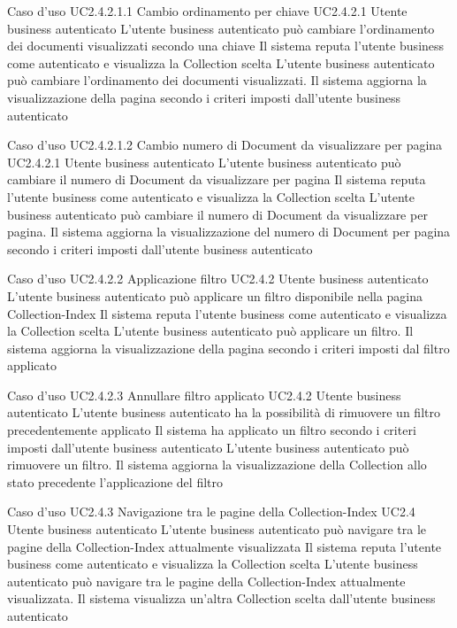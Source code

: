 \UCtitle
{Caso d'uso UC2.4.2.1.1}
{Cambio ordinamento per chiave}
\UC
{UC2.4.2.1}
{Utente business autenticato}
{L'utente business autenticato può cambiare l'ordinamento dei documenti visualizzati secondo una chiave}
{Il sistema reputa l'utente business come autenticato e visualizza la Collection scelta}
\scenario
{L'utente business autenticato può cambiare l'ordinamento dei documenti visualizzati.}
\post
{Il sistema aggiorna la visualizzazione della pagina secondo i criteri imposti dall'utente business autenticato}


\UCtitle
{Caso d'uso UC2.4.2.1.2}
{Cambio numero di Document da visualizzare per pagina}
\UC
{UC2.4.2.1}
{Utente business autenticato}
{L'utente business autenticato può cambiare il numero di Document da visualizzare per pagina}
{Il sistema reputa l'utente business come autenticato e visualizza la Collection scelta}
\scenario
{L'utente business autenticato può cambiare il numero di Document da visualizzare per pagina.}
\post
{Il sistema aggiorna la visualizzazione del numero di Document per pagina secondo i criteri imposti dall'utente business autenticato}

\UCtitle
{Caso d'uso UC2.4.2.2}
{Applicazione filtro}
\UC
{UC2.4.2}
{Utente business autenticato}
{L'utente business autenticato può applicare un filtro disponibile nella pagina Collection-Index}
{Il sistema reputa l'utente business come autenticato e visualizza la Collection scelta}
\scenario
{L'utente business autenticato può applicare un filtro.}
\post
{Il sistema aggiorna la visualizzazione della pagina secondo i criteri imposti dal filtro applicato}

\UCtitle
{Caso d'uso UC2.4.2.3}
{Annullare filtro applicato}
\UC
{UC2.4.2}
{Utente business autenticato}
{L'utente business autenticato ha la possibilità di rimuovere un filtro precedentemente applicato}
{Il sistema ha applicato un filtro secondo i criteri imposti dall'utente business autenticato}
\scenario
{L'utente business autenticato può rimuovere un filtro.}
\post
{Il sistema aggiorna la visualizzazione della Collection allo stato precedente l'applicazione del filtro}


\UCtitle
{Caso d'uso UC2.4.3}
{Navigazione tra le pagine della Collection-Index}
\UC
{UC2.4}
{Utente business autenticato}
{L'utente business autenticato può navigare tra le pagine della Collection-Index attualmente visualizzata}
{Il sistema reputa l'utente business come autenticato e visualizza la Collection scelta}
\scenario
{L'utente business autenticato può navigare tra le pagine della Collection-Index attualmente visualizzata.}
\post
{Il sistema visualizza un'altra Collection scelta dall'utente business autenticato}

